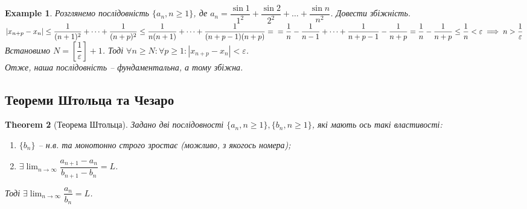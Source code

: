 \documentclass[a4paper, 14pt]{article}
\theoremstyle{theoremdd}
\newtheorem{theorem}{Theorem}[subsection]
\theoremstyle{theoremdd}
\theoremstyle{theoremdd}
\theoremstyle{theoremdd}
\newtheorem{example}[theorem]{Example}
\theoremstyle{theoremdd}
\theoremstyle{theoremdd}
\theoremstyle{theoremdd}
\theoremstyle{theoremdd}
\begin{document}
	\begin{example}
	Розглянемо послідовність $\{a_n, n \geq 1\}$, де $a_n = \dfrac{\sin 1}{1^2} + \dfrac{\sin 2}{2^2} + \dots + \dfrac{\sin n}{n^2}$. Довести збіжність.\\
	$|x_{n+p} - x_n| \leq \dfrac{1}{(n+1)^2} + \dots + \dfrac{1}{(n+p)^2} \leq \dfrac{1}{n(n+1)} + \dots + \dfrac{1}{(n+p-1)(n+p)} = \\ = \dfrac{1}{n} - \dfrac{1}{n-1} + \dots + \dfrac{1}{n+p-1} - \dfrac{1}{n+p} = \dfrac{1}{n} - \dfrac{1}{n+p} \leq \dfrac{1}{n} < \varepsilon \implies n > \dfrac{1}{\varepsilon}$\\
	Встановимо $N = \left[ \dfrac{1}{\varepsilon} \right] + 1$. Тоді $\forall n \geq N: \forall p \geq 1: |x_{n+p} - x_n| < \varepsilon$.\\
	Отже, наша послідовність -- фундаментальна, а тому збіжна.
	\end{example}
	
	\subsection{Теореми Штольца та Чезаро}
	\begin{theorem}[Теорема Штольца]
	Задано дві послідовності $\{a_n, n \geq 1\}, \{b_n, n \geq 1\}$, які мають ось такі властивості:
	\begin{enumerate}[nosep,wide=0pt,label={\arabic*)}]
	\item $\{b_n\}$ -- н.в. та монотонно строго зростає (можливо, з якогось номера);
	\item $\exists \displaystyle \lim_{n \to \infty} \dfrac{a_{n+1} - a_n}{b_{n+1} - b_n} = L$.
	\end{enumerate}
	Тоді $\exists \displaystyle \lim_{n \to \infty} \dfrac{a_n}{b_n} = L$.
	\end{theorem}
	
\end{document}
